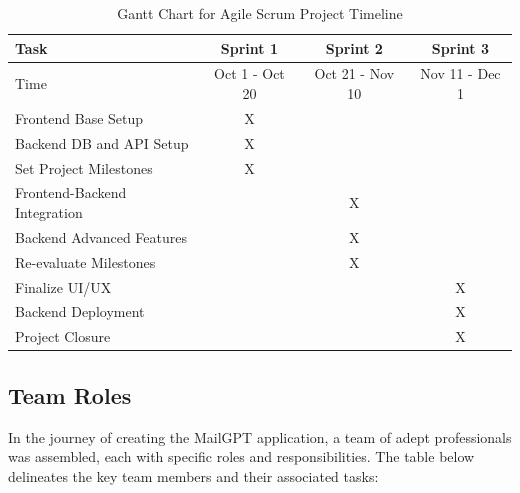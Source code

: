 \documentclass[12pt]{article}
\begin{document}
\begin{table}[ht]
	\centering
	\begin{tabularx}{\textwidth}{|X|c|c|c|}
		\hline
		\rowcolor{gray!30}
		Task                         & Sprint 1       & Sprint 2        & Sprint 3       \\
		\hline
		\rowcolor{gray!30}
				
		Time                         & Oct 1 - Oct 20 & Oct 21 - Nov 10 & Nov 11 - Dec 1 \\
		\hline
		Frontend Base Setup          & X              &                 &                \\
		\hline
		Backend DB and API Setup     & X              &                 &                \\
		\hline
		Set Project Milestones       & X              &                 &                \\
		\hline
		Frontend-Backend Integration &                & X               &                \\
		\hline
		Backend Advanced Features    &                & X               &                \\
		\hline
		Re-evaluate Milestones       &                & X               &                \\
		\hline
		Finalize UI/UX               &                &                 & X              \\
		\hline
		Backend Deployment           &                &                 & X              \\
		\hline
		Project Closure              &                &                 & X              \\
		\hline
	\end{tabularx}
	\caption{Gantt Chart for Agile Scrum Project Timeline}
\end{table}

\subsection{Team Roles}

In the journey of creating the MailGPT application, a team of adept professionals was assembled, each with specific roles and responsibilities. The table below delineates the key team members and their associated tasks:
\end{document}

